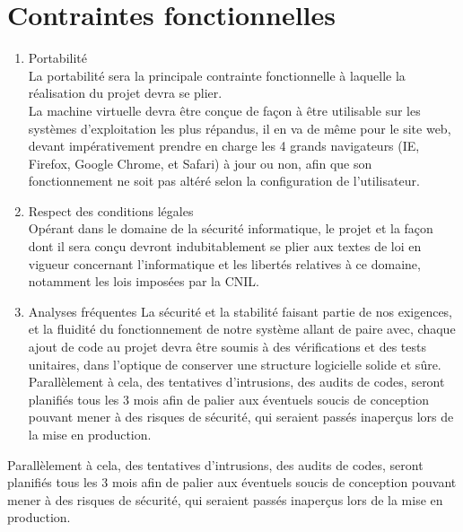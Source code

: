 \section{Contraintes fonctionnelles}
\begin{enumerate}
\item Portabilité\\
La portabilité sera la principale contrainte fonctionnelle à laquelle la réalisation du projet devra se plier.\\
  La machine virtuelle devra être conçue de façon à être utilisable sur les systèmes d'exploitation les plus répandus, il en va de même pour le site web, devant impérativement prendre en charge les 4 grands navigateurs (IE, Firefox, Google Chrome, et Safari) à jour ou non, afin que son fonctionnement ne soit pas altéré selon la configuration de l’utilisateur.\\
\item Respect des conditions légales\\
  Opérant dans le domaine de la sécurité informatique, le projet et la façon dont il sera conçu devront indubitablement se plier aux textes de loi en vigueur concernant l’informatique et les libertés relatives à ce domaine, notamment les lois imposées par la CNIL.\\
\item Analyses fréquentes
La sécurité et la stabilité faisant partie de nos exigences, et la fluidité du fonctionnement de notre système allant de paire avec, chaque ajout de code au projet devra être soumis à des vérifications et des tests unitaires, dans l'optique de conserver une structure logicielle solide et sûre.\\
Parallèlement à cela, des tentatives d'intrusions, des audits de codes, seront planifiés tous les 3 mois afin de palier aux éventuels soucis de conception pouvant mener à des risques de sécurité, qui seraient passés inaperçus lors de la mise en production.\\
\end{enumerate}
Parallèlement à cela, des tentatives d'intrusions, des audits de codes, seront planifiés tous les 3 mois afin de palier aux éventuels soucis de conception pouvant mener à des risques de sécurité, qui seraient passés inaperçus lors de la mise en production.\\

